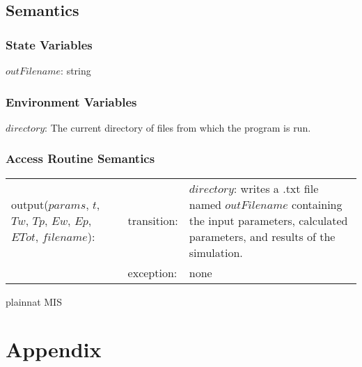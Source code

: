 \documentclass[12pt]{article}
\begin{document}
\subsection{Semantics}

\subsubsection{State Variables}

$outFilename$: string

\subsubsection{Environment Variables}

$directory$: The current directory of files from which the program is run.

\subsubsection{Access Routine Semantics}

\begin{center}
\begin{tabular}{l l p{4cm}}
output($params$, $t$, $Tw$, $Tp$, $Ew$, $Ep$, $ETot$, $filename$): & transition:
  & $directory$: writes a .txt file named $outFilename$ containing the input
    parameters, calculated parameters, and results of the simulation. \\

& exception: & none \\
\end{tabular}
\end{center}

 {plainnat}
 {MIS}

\newpage
\section{Appendix} \label{Appendix}

\renewcommand{\arraystretch}{1.2}
\end{document}

